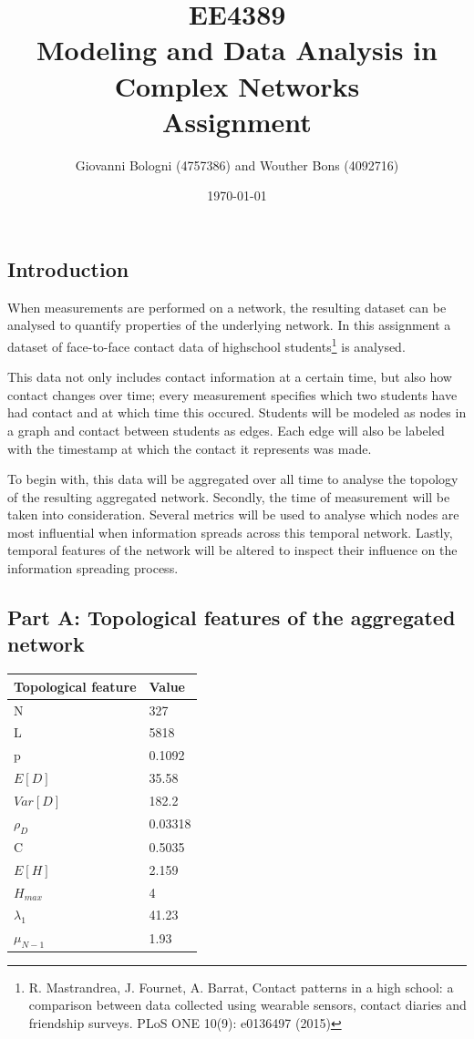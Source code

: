 \documentclass[letterpaper]{article}
\author{Giovanni Bologni (4757386) and Wouther Bons (4092716)}
\date{\today}
\title{EE4389\\Modeling and Data Analysis in Complex Networks\\Assignment}
\begin{document}
\maketitle

\subsection*{Introduction}
When measurements are performed on a network, the resulting dataset can be analysed to quantify properties of the underlying network. In this assignment a dataset of face-to-face contact data of highschool students\footnote{R. Mastrandrea, J. Fournet, A. Barrat, Contact patterns in a high school: a comparison between data collected using wearable sensors, contact diaries and friendship surveys. PLoS ONE 10(9): e0136497 (2015)} is analysed.

This data not only includes contact information at a certain time, but also how contact changes over time; every measurement specifies which two students have had contact and at which time this occured. Students will be modeled as nodes in a graph and contact between students as edges. Each edge will also be labeled with the timestamp at which the contact it represents was made.

To begin with, this data will be aggregated over all time to analyse the topology of the resulting aggregated network. Secondly, the time of measurement will be taken into consideration. Several metrics will be used to analyse which nodes are most influential when information spreads across this temporal network. Lastly, temporal features of the network will be altered to inspect their influence on the information spreading process.

\subsection*{Part A: Topological features of the aggregated network}


\begin{tabular}{l l}
\textbf{Topological feature} & \textbf{Value} \\ 
\midrule
N & 327 \\
L & 5818 \\ 
p  & 0.1092 \\ 
$E[D]$  & 35.58\\
$Var[D]$ & 182.2 \\
$\rho_D$ & 0.03318\\
C & 0.5035\\
$E[H]$ & 2.159\\
$H_{max}$ & 4\\
$\lambda_1$ & 41.23\\
$\mu_{N-1}$ & 1.93\\
\bottomrule
\end{tabular}
\bigskip
\end{document}

